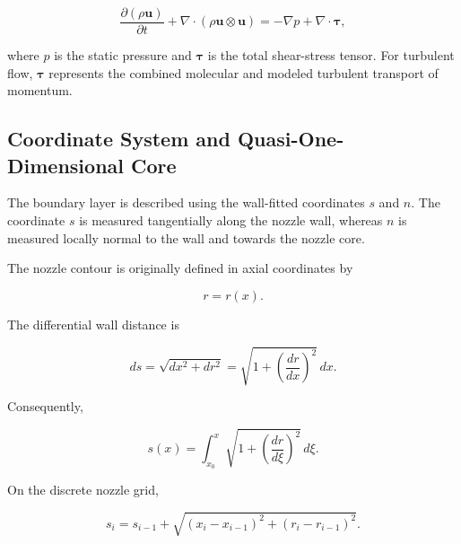 \begin{equation}
    \frac{\partial(\rho\boldsymbol{u})}{\partial t}
    +
    \nabla\cdot
    \left(
        \rho\boldsymbol{u}\otimes\boldsymbol{u}
    \right)
    =
    -\nabla p
    +
    \nabla\cdot\boldsymbol{\tau},
    \label{eq:momentum_transport_vector}
\end{equation}

where \(p\) is the static pressure and \(\boldsymbol{\tau}\) is the total
shear-stress tensor. For turbulent flow, \(\boldsymbol{\tau}\) represents the
combined molecular and modeled turbulent transport of momentum.

\subsection{Coordinate System and Quasi-One-Dimensional Core}

The boundary layer is described using the wall-fitted coordinates \(s\) and
\(n\). The coordinate \(s\) is measured tangentially along the nozzle wall,
whereas \(n\) is measured locally normal to the wall and towards the nozzle
core.

The nozzle contour is originally defined in axial coordinates by

\begin{equation}
    r=r(x).
\end{equation}

The differential wall distance is

\begin{equation}
    ds
    =
    \sqrt{dx^2+dr^2}
    =
    \sqrt{
        1+
        \left(
            \frac{dr}{dx}
        \right)^2
    }\,dx.
    \label{eq:wall_arc_length}
\end{equation}

Consequently,

\begin{equation}
    s(x)
    =
    \int_{x_0}^{x}
    \sqrt{
        1+
        \left(
            \frac{dr}{d\xi}
        \right)^2
    }\,d\xi.
    \label{eq:wall_coordinate}
\end{equation}

On the discrete nozzle grid,

\begin{equation}
    s_i
    =
    s_{i-1}
    +
    \sqrt{
        (x_i-x_{i-1})^2+
        (r_i-r_{i-1})^2
    }.
    \label{eq:discrete_wall_coordinate}
\end{equation}

